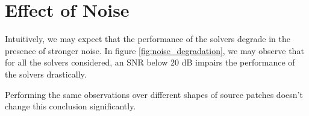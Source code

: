 \section{Effect of Noise}

Intuitively, we may expect that the performance of the solvers degrade in the presence of stronger noise.
%
In figure \ref{fig:noise_degradation}, we may observe that for all the solvers considered, an SNR below 20 dB impairs the performance of the solvers drastically.

Performing the same observations over different shapes of source patches doesn't change this conclusion significantly.

